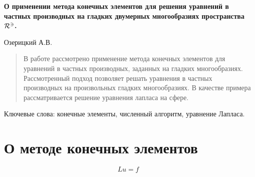 \documentclass[a4paper,article]{article}
\begin{document}

{\bf \Large О применении метода конечных элементов для решения
  уравнений в частных производных на гладких двумерных многообразиях
  пространства $\cal R^{3}$.}

\begin{center}
Озерицкий А.В.
\end{center}

\renewcommand{\abstractname}{}
\begin{abstract}
{\small
{}
В работе рассмотрено применение метода конечных элементов для
уравнений в частных производных, заданных на гладких многообразиях.
Рассмотренный подход позволяет решать уравнения в частных производных
на произвольных гладких многообразиях. 
В качестве примера рассматривается решение уравнения лапласа на сфере.}
\end{abstract}

Ключевые слова: конечные элементы, численный алгоритм, уравнение
Лапласа.

\section*{О методе конечных элементов}
\begin{equation*}
Lu = f
\end{equation*}
\end{document}
